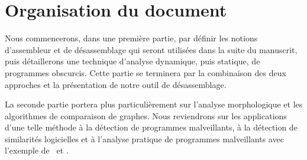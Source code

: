 \section*{Organisation du document}

Nous commencerons, dans une première partie, par définir les notions d'assembleur et de désassemblage qui seront utilisées dans la suite du manuscrit, puis détaillerons une technique d'analyse dynamique, puis statique, de programmes obscurcis. Cette partie se terminera par la combinaison des deux approches et la présentation de notre outil de désassemblage.

La seconde partie portera plus particulièrement sur l'analyse morphologique et les algorithmes de comparaison de graphes. Nous reviendrons sur les applications d'une telle méthode à la détection de programmes malveillants, à la détection de similarités logicielles et à l'analyse pratique de programmes malveillants avec l'exemple de \duqu\ et \stux.
